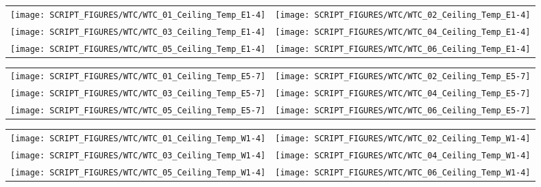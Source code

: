 \begin{figure}[!ht]
\begin{tabular*}{\textwidth}{l@{\extracolsep{\fill}}r}
\texttt{[image: SCRIPT\_FIGURES/WTC/WTC\_01\_Ceiling\_Temp\_E1-4]} &
\texttt{[image: SCRIPT\_FIGURES/WTC/WTC\_02\_Ceiling\_Temp\_E1-4]} \\
\texttt{[image: SCRIPT\_FIGURES/WTC/WTC\_03\_Ceiling\_Temp\_E1-4]} &
\texttt{[image: SCRIPT\_FIGURES/WTC/WTC\_04\_Ceiling\_Temp\_E1-4]} \\
\texttt{[image: SCRIPT\_FIGURES/WTC/WTC\_05\_Ceiling\_Temp\_E1-4]} &
\texttt{[image: SCRIPT\_FIGURES/WTC/WTC\_06\_Ceiling\_Temp\_E1-4]}
\end{tabular*}
\label{NIST_WTC_Ceiling_E1-4}
\end{figure}

\begin{figure}[!ht]
\begin{tabular*}{\textwidth}{l@{\extracolsep{\fill}}r}
\texttt{[image: SCRIPT\_FIGURES/WTC/WTC\_01\_Ceiling\_Temp\_E5-7]} &
\texttt{[image: SCRIPT\_FIGURES/WTC/WTC\_02\_Ceiling\_Temp\_E5-7]} \\
\texttt{[image: SCRIPT\_FIGURES/WTC/WTC\_03\_Ceiling\_Temp\_E5-7]} &
\texttt{[image: SCRIPT\_FIGURES/WTC/WTC\_04\_Ceiling\_Temp\_E5-7]} \\
\texttt{[image: SCRIPT\_FIGURES/WTC/WTC\_05\_Ceiling\_Temp\_E5-7]} &
\texttt{[image: SCRIPT\_FIGURES/WTC/WTC\_06\_Ceiling\_Temp\_E5-7]}
\end{tabular*}
\label{NIST_WTC_Ceiling_E5-7}
\end{figure}

\begin{figure}[!ht]
\begin{tabular*}{\textwidth}{l@{\extracolsep{\fill}}r}
\texttt{[image: SCRIPT\_FIGURES/WTC/WTC\_01\_Ceiling\_Temp\_W1-4]} &
\texttt{[image: SCRIPT\_FIGURES/WTC/WTC\_02\_Ceiling\_Temp\_W1-4]} \\
\texttt{[image: SCRIPT\_FIGURES/WTC/WTC\_03\_Ceiling\_Temp\_W1-4]} &
\texttt{[image: SCRIPT\_FIGURES/WTC/WTC\_04\_Ceiling\_Temp\_W1-4]} \\
\texttt{[image: SCRIPT\_FIGURES/WTC/WTC\_05\_Ceiling\_Temp\_W1-4]} &
\texttt{[image: SCRIPT\_FIGURES/WTC/WTC\_06\_Ceiling\_Temp\_W1-4]}
\end{tabular*}
\label{NIST_WTC_Ceiling_W1-4}
\end{figure}

